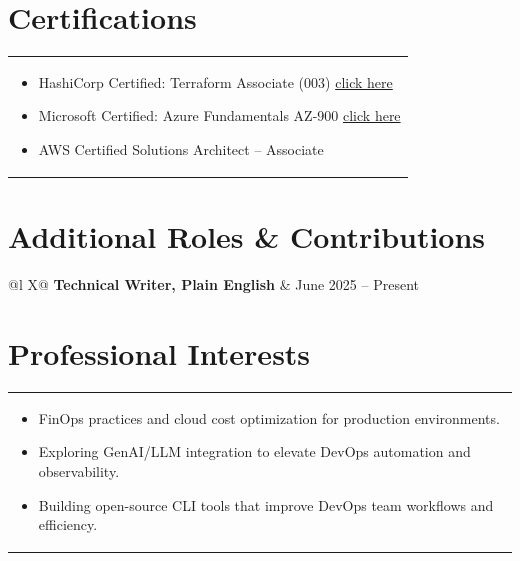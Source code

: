 \documentclass[a4paper,12pt]{article}
\begin{document}
\section{Certifications}
\begin{tabularx}{\linewidth}{@{}X@{}}
\begin{itemize}[leftmargin=*]\setlength{\itemsep}{0pt}
\item HashiCorp Certified: Terraform Associate (003) \href{https://www.credly.com/badges/f1d5c44f-f2c8-4e31-93eb-f94f44282e97/linked_in_profile?trk=public_profile_certification-title}{click here}
\item Microsoft Certified: Azure Fundamentals AZ-900 \href{https://www.credly.com/badges/18cfe8ff-55b4-45cf-8ba6-9b3c17c51133/linked_in_profile?trk=public_profile_see-credential}{click here}
\item AWS Certified Solutions Architect – Associate
\end{itemize}
\end{tabularx}
\section{Additional Roles \& Contributions}
\begin{tabularx}{\linewidth}{@{}l X@{}}
\textbf{Technical Writer, Plain English} & \hfill June 2025 – Present \\
\end{tabularx}
\section{Professional Interests}
\begin{tabularx}{\linewidth}{@{}X@{}}
\begin{itemize}[leftmargin=*]
\item FinOps practices and cloud cost optimization for production environments.
\item Exploring GenAI/LLM integration to elevate DevOps automation and observability.
\item Building open-source CLI tools that improve DevOps team workflows and efficiency.
\end{itemize}
\end{tabularx}
\end{document}
